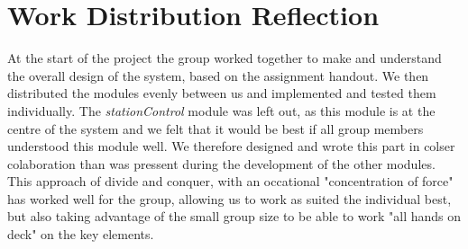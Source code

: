 \section{Work Distribution Reflection}

At the start of the project the group worked together to make and 
understand the overall design of the system, based on the assignment 
handout. We then distributed the modules evenly between us and implemented
and tested them individually. The \textit{stationControl} module was left
out, as this module is at the centre of the system and we felt that it would
be best if all group members understood this module well. We therefore designed
and wrote this part in colser colaboration than was pressent during the 
development of the other modules.\\

This approach of divide and conquer, with an occational "concentration of force"
has worked well for the group, allowing us to work as suited the individual best,
but also taking advantage of the small group size to be able to work "all hands on deck" on the key elements.

\newpage
